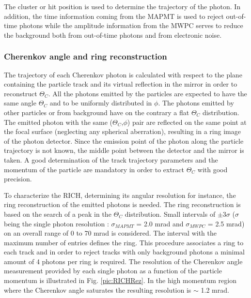 The cluster or hit position is used to determine the trajectory of the photon. In addition, the time information coming from the MAPMT is used to reject out-of-time photons while the amplitude information from the MWPC serves to reduce the background both from out-of-time photons and from electronic noise.\cite{}

\subsubsection*{Cherenkov angle and ring reconstruction}

The trajectory of each Cherenkov photon is calculated with respect to the plane containing the particle track and its virtual reflection in the mirror in order to reconstruct $\Theta_C$\cite{}. All the photons emitted by the particles are expected to have the same angle $\Theta_C$ and to be uniformly distributed in $\phi$. The photons emitted by other particles or from background have on the contrary a flat $\Theta_C$ distribution. The emitted photon with the same ($\Theta_C$,$\phi$) pair are reflected on the same point at the focal surface (neglecting any spherical aberration), resulting in a ring image of the photon detector. Since the emission point of the photon along the particle trajectory is not known, the middle point between the detector and the mirror is taken. A good determination of the track trajectory parameters and the momentum of the particle are mandatory in order to extract $\Theta_C$ with good precision.

To characterize the RICH, determining its angular resolution for instance, the ring reconstruction of the emitted photons is needed. The ring reconstruction is based on the search of a peak in the $\Theta_C$ distribution. Small intervals of $\pm$3$\sigma$ ($\sigma$ being the single photon resolution : $\sigma_{MAPMT}$ = 2.0 mrad and $\sigma_{MWPC}$ = 2.5 mrad) on an overall range of 0 to 70 mrad is considered. The interval with the maximum number of entries defines the ring. This procedure associates a ring to each track and in order to reject tracks with only background photons a minimal amount of 4 photons per ring is required\cite{}. The resolution of the Cherenkov angle measurement provided by each single photon as a function of the particle momentum is illustrated in Fig. \ref{pic:RICHRez}. In the high momentum region where the Cherenkov angle saturates the resulting resolution is $\sim$ 1.2 mrad.


